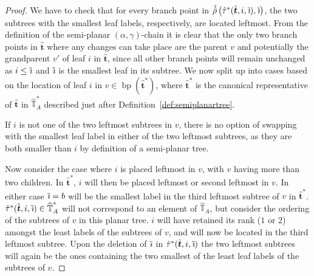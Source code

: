 \documentclass[a4paper, final]{amsart}
\theoremstyle{plain}
\theoremstyle{definition}
\newcommand{\that}[1][t]{\hat{\boldsymbol{#1}}} %
\newcommand{\Thatspace}[1][\T]{\widehat{\boldsymbol{#1}}} %
\newcommand{\T}{\mathbb{T}}
\DeclareMathOperator{\branchpoints}{bp}
\DeclareMathOperator{\tildei}{\tilde{\textit{\i}}}
\begin{document}
\begin{proof}
  We have to check that for every branch point in $\mathring{\hat{\rho}} \left( \hat{\tau}^* (\that, i, \tildei), \tildei \right)$, the two subtrees with the smallest leaf labels, respectively, are located leftmost.
  From the definition of the semi-planar $(\alpha, \gamma)$-chain it is clear that the only two branch points in $\that$ where any changes can take place are the parent $v$ and potentially the grandparent $v'$ of leaf $i$ in $\that$, since all other branch points will remain unchanged as $i \leq \tildei$ and $\tildei$ is the smallest leaf in its subtree.
  We now split up into cases based on the location of leaf $i$ in $v \in \branchpoints (\that^*)$, where $\that^*$ is the canonical representative of $\that$ in $\Thatspace_A^*$ described just after Definition~\ref{def:semiplanartree}.

  If $i$ is not one of the two leftmost subtrees in $v$, there is no option of swapping with the smallest leaf label in either of the two leftmost subtrees, as they are both smaller than $i$ by definition of a semi-planar tree.

  Now consider the case where $i$ is placed leftmost in $v$, with $v$ having more than two children.
  In $\that^*$, $i$ will then be placed leftmost or second leftmost in $v$.
  In either case $\tildei = b$ will be the smallest label in the third leftmost subtree of $v$ in $\that^*$.
  $\hat{\tau}^* (\that, i, \tildei) \in \Thatspace_A^*$ will not correspond to an element of $\Thatspace_A$, but consider the ordering of the subtrees of $v$ in this planar tree.
  $i$ will have retained its rank ($1$ or $2$) amongst the least labels of the subtrees of $v$, and will now be located in the third leftmost subtree.
  Upon the deletion of $\tildei$ in $\hat{\tau}^* (\that, i, \tildei)$ the two leftmost subtrees will again be the ones containing the two smallest of the least leaf labels of the subtrees of $v$.



\end{proof}
\end{document}
